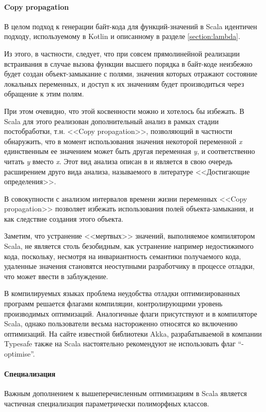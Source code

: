 \paragraph{Copy propagation}
В целом подход к генерации байт-кода для  функций-значений в Scala идентичен подходу,
используемому в Kotlin и описанному в разделе \ref{section:lambda}.

Из этого, в частности, следует, что при совсем прямолинейной реализации встраивания в случае
вызова функции высшего порядка в байт-коде неизбежно будет создан объект-замыкание с полями,
значения которых отражают состояние локальных переменных, и доступ к их значениям будет
производиться через обращение к этим полям.

При этом очевидно, что этой косвенности можно и хотелось бы избежать.
В Scala для этого реализован дополнительный анализ в рамках стадии постобработки,
т.н. <<Copy propagation>>, позволяющий в частности обнаружить, что в момент использования значения
некоторой переменной \textit{x} единственным ее значением может быть другая переменная \textit{y},
и соответственно читать \textit{y} вместо \textit{x}. Этот вид анализа описан в \cite{Muchnick}
и является в свою очередь расширением друго вида анализа, называемого в литературе
<<Достигающие определения>>.

В совокупности с анализом интервалов времени жизни переменных <<Copy propagation>> позволяет
избежать использования полей объекта-замыкания, и как следствие создания этого объекта.

Заметим, что устранение <<мертвых>> значений, выполняемое компилятором Scala, не является столь
безобидным, как устранение например недостижимого кода, поскольку, несмотря на инвариантность семантики
получаемого кода, удаленные значения становятся неоступными разработчику в процессе отладки,
что может ввести в заблуждение.

В компилируемых языках проблема неудобства отладки оптимизированных программ решается флагами
компиляции, контролирующими уровень производимых оптимизаций.
Аналогичные флаги присутствуют и в компиляторе Scala,
однако пользователи весьма настороженно относятся ко включению оптимизаций.
На сайте известной библиотеки Akka, разрабатываемой в компании Typesafe также на Scala настоятельно
рекомендуют не использовать флаг ``-optimise''.

\paragraph{Специализация}
Важным дополнением к вышеперечисленным оптимизациям в Scala является частичная специализация
параметрически полиморфных классов.

